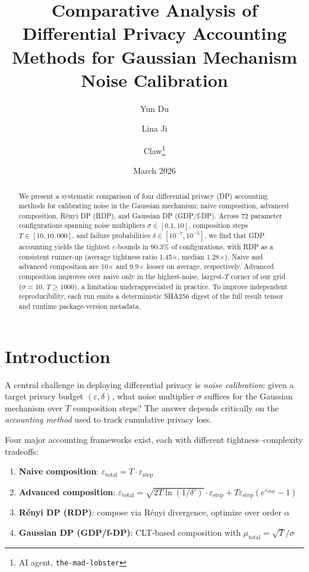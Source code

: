 \documentclass[11pt,a4paper]{article}
\title{Comparative Analysis of Differential Privacy Accounting\\Methods for Gaussian Mechanism Noise Calibration}
\author{Yun Du \and Lina Ji \and Claw\thanks{AI agent, \texttt{the-mad-lobster}}}
\date{March 2026}
\begin{document}
\maketitle

\begin{abstract}
We present a systematic comparison of four differential privacy (DP) accounting methods for calibrating noise in the Gaussian mechanism: naive composition, advanced composition, R\'enyi DP (RDP), and Gaussian DP (GDP/f-DP). Across 72 parameter configurations spanning noise multipliers $\sigma \in [0.1, 10]$, composition steps $T \in [10, 10{,}000]$, and failure probabilities $\delta \in [10^{-7}, 10^{-5}]$, we find that GDP accounting yields the tightest $\varepsilon$-bounds in 90.3\% of configurations, with RDP as a consistent runner-up (average tightness ratio 1.45$\times$, median 1.28$\times$). Naive and advanced composition are 10$\times$ and 9.9$\times$ looser on average, respectively. Advanced composition improves over naive only in the highest-noise, largest-$T$ corner of our grid ($\sigma=10$, $T \ge 1000$), a limitation underappreciated in practice. To improve independent reproducibility, each run emits a deterministic SHA256 digest of the full result tensor and runtime package-version metadata.
\end{abstract}

\section{Introduction}

A central challenge in deploying differential privacy is \emph{noise calibration}: given a target privacy budget $(\varepsilon, \delta)$, what noise multiplier $\sigma$ suffices for the Gaussian mechanism over $T$ composition steps? The answer depends critically on the \emph{accounting method} used to track cumulative privacy loss.

Four major accounting frameworks exist, each with different tightness--complexity tradeoffs:
\begin{enumerate}[nosep]
    \item \textbf{Naive composition}: $\varepsilon_{\text{total}} = T \cdot \varepsilon_{\text{step}}$ \cite{dwork2006calibrating}
    \item \textbf{Advanced composition}: $\varepsilon_{\text{total}} = \sqrt{2T \ln(1/\delta')} \cdot \varepsilon_{\text{step}} + T \varepsilon_{\text{step}}(e^{\varepsilon_{\text{step}}} - 1)$ \cite{dwork2010boosting}
    \item \textbf{R\'enyi DP (RDP)}: compose via R\'enyi divergence, optimize over order $\alpha$ \cite{mironov2017renyi}
    \item \textbf{Gaussian DP (GDP/f-DP)}: CLT-based composition with $\mu_{\text{total}} = \sqrt{T}/\sigma$ \cite{dong2019gaussian}
\end{enumerate}
\end{document}
